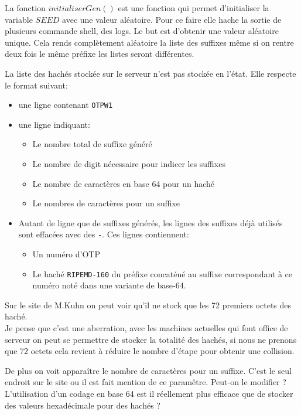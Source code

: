 \documentclass{../res/univ-projet}
\begin{document}
    La fonction $initialiserGen()$ est une fonction qui permet d'initialiser
    la variable $SEED$ avec une valeur aléatoire. Pour ce faire elle hache la sortie
    de plusieurs commande shell, des logs. Le but est d'obtenir une valeur aléatoire
    unique. Cela rends complètement aléatoire la liste des suffixes même si on rentre
    deux fois le même préfixe les listes seront différentes.

    La liste des hachés stockée sur le serveur n'est pas stockée en l'état. Elle respecte
    le format suivant:
    \begin{itemize}
        \item une ligne contenant \verb?OTPW1?
        \item une ligne indiquant:
            \begin{itemize}
                \item Le nombre total de suffixe généré
                \item Le nombre de digit nécessaire pour indicer les suffixes
                \item Le nombre de caractères en base 64 pour un haché
                \item Le nombres de caractères pour un suffixe
            \end{itemize}
        \item Autant de ligne que de suffixes générés, les lignes des
            suffixes déjà utilisés sont effacées avec des \verb?-?.
            Ces lignes contiennent:
            \begin{itemize}
                \item Un numéro d'OTP
                \item Le haché \verb?RIPEMD-160? du préfixe concaténé
                    au suffixe correspondant à ce numéro noté dans une variante de base-64.
            \end{itemize}
    \end{itemize}
    Sur le site de M.Kuhn on peut voir qu'il ne stock que les 72 premiers octets des haché.\\
    Je pense que c'est une aberration, avec les machines actuelles qui font office de serveur
    on peut se permettre de stocker la totalité des hachés, si nous ne prenons que 72 octets
    cela revient à réduire le nombre d'étape pour obtenir une collision.
    
    De plus on voit apparaître le nombre de caractères pour un suffixe. C'est le seul endroit
    sur le site ou il est fait mention de ce paramêtre. Peut-on le modifier ?\\
    L'utilisation d'un codage en base 64 est il réellement plus efficace que de stocker
    des valeurs hexadécimale pour des hachés ?
\end{document}
